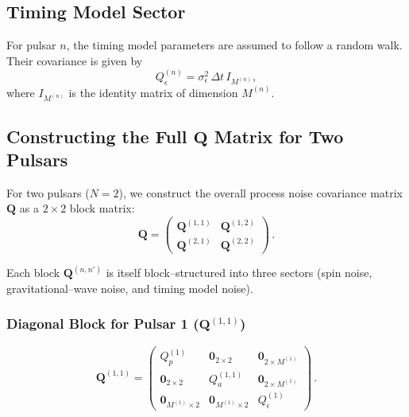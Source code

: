 \documentclass{tufte-handout} %
\begin{document}
	\subsection*{Timing Model Sector}
	
	For pulsar \(n\), the timing model parameters are assumed to follow a random walk. Their covariance is given by
	\begin{equation}
		Q_\epsilon^{(n)} = \sigma_\epsilon^2\,\Delta t\,I_{M^{(n)}},
	\end{equation}
	where \(I_{M^{(n)}}\) is the identity matrix of dimension \(M^{(n)}\).
	
	\subsection*{Constructing the Full \(\boldsymbol{Q}\) Matrix for Two Pulsars}
	
	For two pulsars (\(N=2\)), we construct the overall process noise covariance matrix \(\boldsymbol{Q}\) as a \(2\times2\) block matrix:
	\begin{equation}
		\boldsymbol{Q} =
		\begin{pmatrix}
			\boldsymbol{Q}^{(1,1)} & \boldsymbol{Q}^{(1,2)} \\[1mm]
			\boldsymbol{Q}^{(2,1)} & \boldsymbol{Q}^{(2,2)}
		\end{pmatrix}\,.
	\end{equation}
	
	Each block \(\boldsymbol{Q}^{(n,n')}\) is itself block–structured into three sectors (spin noise, gravitational–wave noise, and timing model noise).
	
	\subsubsection*{Diagonal Block for Pulsar 1 (\(\boldsymbol{Q}^{(1,1)}\))}
	
	\begin{equation}
		\boldsymbol{Q}^{(1,1)} =
		\begin{pmatrix}
			Q_p^{(1)} & \boldsymbol{0}_{2\times2} & \boldsymbol{0}_{2\times M^{(1)}} \\[2mm]
			\boldsymbol{0}_{2\times2} & Q_a^{(1,1)} & \boldsymbol{0}_{2\times M^{(1)}} \\[2mm]
			\boldsymbol{0}_{M^{(1)}\times2} & \boldsymbol{0}_{M^{(1)}\times2} & Q_\epsilon^{(1)}
		\end{pmatrix}\,.
	\end{equation}
	
\end{document}
